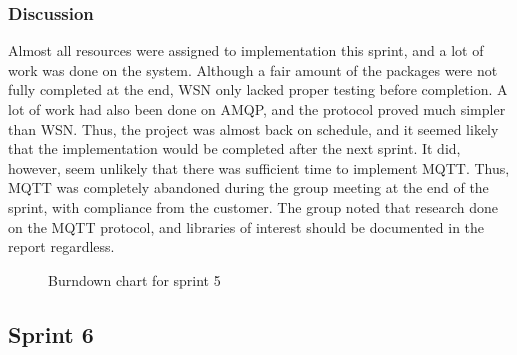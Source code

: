 \subsubsection{Discussion}
\label{subsec:project_lifecycle-development-sprint_5-discussion}

Almost all resources were assigned to implementation this sprint, and a lot of work was done on the system. Although a fair amount of the packages were not fully completed at the end, WSN only lacked proper testing before completion. A lot of work had also been done on AMQP, and the protocol proved much simpler than WSN. Thus, the project was almost back on schedule, and it seemed likely that the implementation would be completed after the next sprint. It did, however, seem unlikely that there was sufficient time to implement MQTT. Thus, MQTT was completely abandoned during the group meeting at the end of the sprint, with compliance from the customer. The group noted that research done on the MQTT protocol, and libraries of interest should be documented in the report regardless.

\begin{center}
  \begin{figure}[ht!]
    \caption{Burndown chart for sprint 5}
    \label{fig:sprint 5, burndown}
  \end{figure}
\end{center}

\subsection{Sprint 6}
\label{subsec:project_lifecycle-development-sprint_6}

